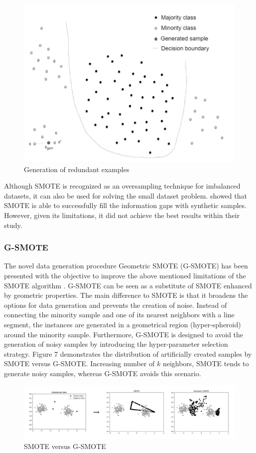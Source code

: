 \documentclass[parskip=full]{scrartcl}
\begin{document}
\begin{figure}[H]
	\centering
	\includegraphics[width=0.6\linewidth]{./resources/redundant_examples}
	\caption{Generation of redundant examples \cite{Douzas.2019b}}
	\label{fig:redundant-examples}
\end{figure}

Although SMOTE is recognized as an oversampling technique for imbalanced datasets, it can also be 
used for solving the small dataset problem.  \cite{Li.2018} showed that SMOTE is able to successfully 
fill the information gaps with synthetic samples. However, given its limitations, it did not achieve the 
best results within their study.

\subsubsection{G-SMOTE}

The novel data generation procedure Geometric SMOTE (G-SMOTE) has been presented with the 
objective to improve the above mentioned limitations of the SMOTE algorithm \cite{Douzas.2019b}. 
G-SMOTE can be seen as a substitute of SMOTE enhanced by geometric properties. The main 
difference to SMOTE is that it broadens the options for data generation and prevents the creation of 
noise. Instead of connecting the minority sample and one of its nearest neighbors with a line segment, 
the instances are generated in a geometrical region (hyper-spheroid) around the minority sample. 
Furthermore, G-SMOTE is designed to avoid the generation of noisy samples by introducing the 
hyper-parameter selection strategy. Figure 7 demonstrates the distribution of artificially created 
samples by SMOTE versus G-SMOTE. Increasing number of $\mathit{k}$ neighbors, SMOTE tends to 
generate noisy samples, whereas G-SMOTE avoids this scenario.

\begin{figure}[H]
	\centering
	\includegraphics[width=1\linewidth]{./resources/smote_vs_gsmote}
	\caption{SMOTE versus G-SMOTE \cite{Douzas.2019}}
	\label{fig:smotevsgsmote}
\end{figure}
\end{document}
